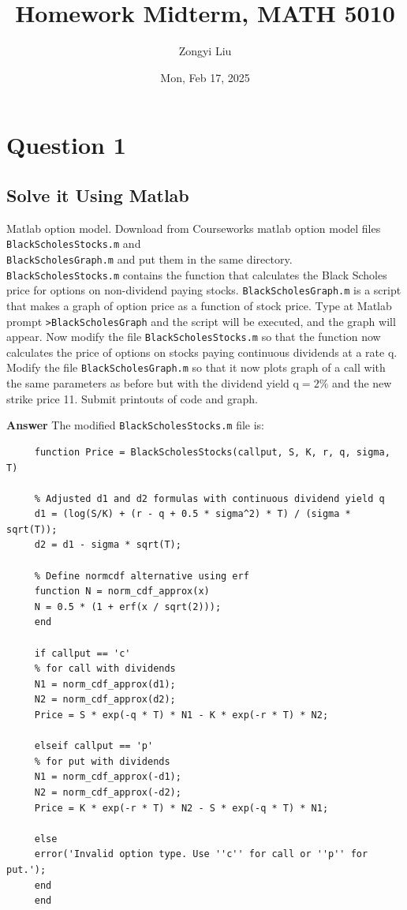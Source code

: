 \documentclass[letterpaper]{article}
\title{Homework Midterm, MATH 5010}
\author{Zongyi Liu}
\date{Mon, Feb 17, 2025}
\begin{document}
		\maketitle
		
\section{Question 1}
\subsection{Solve it Using Matlab}
		Matlab option model. Download from Courseworks matlab option model files \texttt{BlackScholesStocks.m} and \\ \texttt{BlackScholesGraph.m} and put them in the same directory. \texttt{BlackScholesStocks.m} contains the function that calculates the Black Scholes price for options on non-dividend paying stocks. \texttt{BlackScholesGraph.m} is a script that makes a graph of option price as a function of stock price. Type at Matlab prompt \texttt{>BlackScholesGraph} and the script will be executed, and the graph will appear. Now modify the file \texttt{BlackScholesStocks.m} so that the function now calculates the price of options on stocks paying continuous dividends at a rate q. Modify the file \texttt{BlackScholesGraph.m} so that it now plots graph of a call with the same parameters as before but with the dividend yield $\mathrm{q}=2 \%$ and the new strike price 11. Submit printouts of code and graph.

		\textbf{Answer}
		The modified \texttt{BlackScholesStocks.m} file is:
		
		\begin{lstlisting}
     function Price = BlackScholesStocks(callput, S, K, r, q, sigma, T)
     
     % Adjusted d1 and d2 formulas with continuous dividend yield q
     d1 = (log(S/K) + (r - q + 0.5 * sigma^2) * T) / (sigma * sqrt(T));
     d2 = d1 - sigma * sqrt(T);
     
     % Define normcdf alternative using erf
     function N = norm_cdf_approx(x)
     N = 0.5 * (1 + erf(x / sqrt(2)));
     end
     
     if callput == 'c'   
     % for call with dividends
     N1 = norm_cdf_approx(d1);
     N2 = norm_cdf_approx(d2);
     Price = S * exp(-q * T) * N1 - K * exp(-r * T) * N2;
     
     elseif callput == 'p'
     % for put with dividends
     N1 = norm_cdf_approx(-d1);
     N2 = norm_cdf_approx(-d2);
     Price = K * exp(-r * T) * N2 - S * exp(-q * T) * N1;
     
     else
     error('Invalid option type. Use ''c'' for call or ''p'' for put.');
     end
     end
     
		\end{lstlisting}
	
\end{document}
